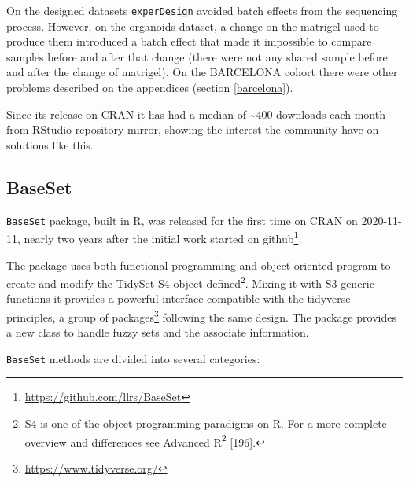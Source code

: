 \documentclass[
  12pt,
  a4paper,
  twoside,
  openright]{book}
\DeclareRobustCommand{\href}[2]{#2\footnote{\url{#1}}}
\begin{document}
On the designed datasets \texttt{experDesign} avoided batch effects from the sequencing process.
However, on the organoids dataset, a change on the matrigel used to produce them introduced a batch effect that made it impossible to compare samples before and after that change (there were not any shared sample before and after the change of matrigel).
On the BARCELONA cohort there were other problems described on the appendices (section \ref{barcelona}).

Since its release on CRAN it has had a median of \textasciitilde400 downloads each month from RStudio repository mirror, showing the interest the community have on solutions like this.

\hypertarget{baseset-1}{%
\subsection{BaseSet}\label{baseset-1}}

\texttt{BaseSet} package, built in R, was released for the first time on CRAN on 2020-11-11, nearly two years after the initial work started on \href{https://github.com/llrs/BaseSet}{github}.

The package uses both functional programming and object oriented program to create and modify the TidySet S4 object defined\footnote{S4 is one of the object programming paradigms on R.
  For a more complete overview and differences see \href{https://adv-r.hadley.nz/oo.html}{Advanced R} {[}\protect\hyperlink{ref-wickham2019}{196}{]}.}.
Mixing it with S3 generic functions it provides a powerful interface compatible with the tidyverse principles, a \href{https://www.tidyverse.org/}{group of packages} following the same design.
The package provides a new class to handle fuzzy sets and the associate information.

\texttt{BaseSet} methods are divided into several categories:
\end{document}
